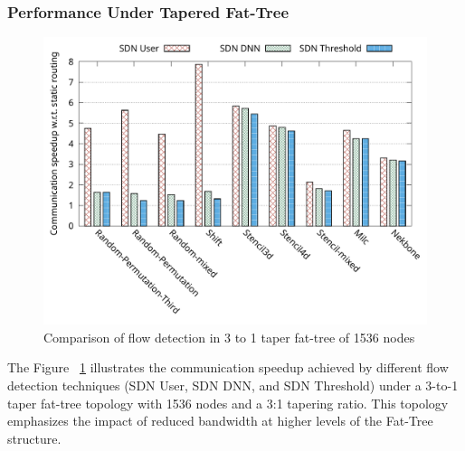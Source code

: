 \subsubsection{Performance Under Tapered Fat-Tree}
\begin{figure}[h]
  \centering
  \includegraphics[width=\columnwidth]{./figs_4/taper_fat_flow_detection.pdf}
  \caption{Comparison of flow detection in 3 to 1 taper fat-tree of 1536 nodes}
  \label{fig:fld_taper}
\end{figure}

The Figure ~\ref{fig:fld_taper} illustrates the communication speedup achieved by different flow detection techniques (SDN User, SDN DNN, and SDN Threshold) under a 3-to-1 taper fat-tree topology with 1536 nodes and a 3:1 tapering ratio. This topology emphasizes the impact of reduced bandwidth at higher levels of the Fat-Tree structure.


